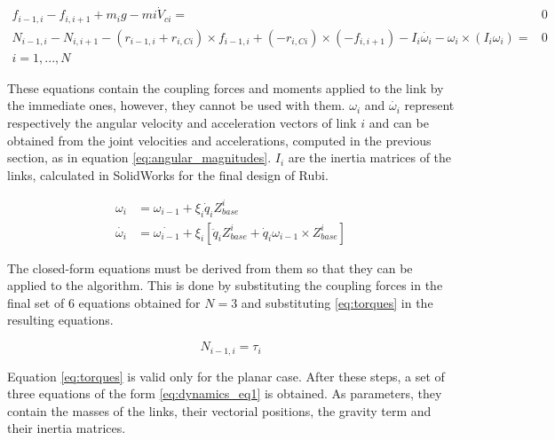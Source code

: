 \begin{equation}
\label{eq:N-E_eq1}
	\begin{aligned}
		f_{i-1, i} - f_{i,i+1} + m_{i} g - m{i} \dot{V}_{ci} =& 0 \\
		N_{i - 1 , i} - N_{i , i + 1} - ( r_{i - 1 , i} + r_{i , Ci} ) \times f_{i - 1 , i} + ( - r_{i , Ci} ) \times ( - f_{i , i + 1}) - I_{i} \dot{\omega_{i}} - \omega_{i} \times ( I_{i} \omega_{i} ) =& 0 \\
		i = 1,..., N 
	\end{aligned}
\end{equation}

These equations contain the coupling forces and moments applied to the link by the immediate ones, however, they cannot be used with them. 
$\omega_{i}$ and $\dot{\omega_{i}}$ represent respectively the angular velocity and acceleration vectors of link $i$ and can be obtained from the joint velocities and accelerations, computed in the previous section, as in equation \ref{eq:angular_magnitudes}.
$I_{i}$ are the inertia matrices of the links, calculated in SolidWorks for the final design of Rubi.

\begin{equation}
\label{eq:angular_magnitudes}	
	\begin{aligned}
		\omega_{i} &= \omega_{i-1} + \xi_{i}\dot{q}_{i}Z_{base}^i\\
		\dot{\omega_{i}} &= \dot{\omega_{i-1}} + \xi_{i}[\ddot{q}_{i}Z_{base}^i + \dot{q}_{i}\omega_{i-1} \times Z_{base}^i]
	\end{aligned}
\end{equation}

The closed-form equations must be derived from them so that they can be applied to the algorithm.
This is done by substituting the coupling forces in the final set of 6 equations obtained for $N=3$ and substituting \ref{eq:torques} in the resulting equations.

\begin{equation}
\label{eq:torques}
	N_{i - 1 , i} = \tau_{i}
\end{equation}

Equation \ref{eq:torques} is valid only for the planar case.
After these steps, a set of three equations of the form \ref{eq:dynamics_eq1} is obtained. 
As parameters, they contain the masses of the links, their vectorial positions, the gravity term and their inertia matrices. 


